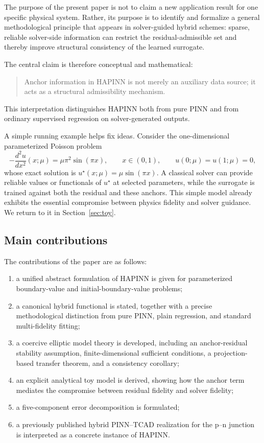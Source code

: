 \documentclass[preprint,12pt]{elsarticle}
\theoremstyle{definition}
\numberwithin{equation}{section}
\begin{document}
The purpose of the present paper is not to claim a new application result for one specific physical system. Rather, its purpose is to identify and formalize a general methodological principle that appears in solver-guided hybrid schemes: sparse, reliable solver-side information can restrict the residual-admissible set and thereby improve structural consistency of the learned surrogate.

The central claim is therefore conceptual and mathematical:
\begin{quote}
Anchor information in HAPINN is not merely an auxiliary data source; it acts as a structural admissibility mechanism.
\end{quote}

This interpretation distinguishes HAPINN both from pure PINN and from ordinary supervised regression on solver-generated outputs.

A simple running example helps fix ideas. Consider the one-dimensional parameterized Poisson problem
\begin{equation}
-\frac{d^2u}{dx^2}(x;\mu)=\mu\pi^2\sin(\pi x),\qquad x\in(0,1),\qquad u(0;\mu)=u(1;\mu)=0,
\label{eq:runningexample}
\end{equation}
whose exact solution is $u^\star(x;\mu)=\mu\sin(\pi x)$. A classical solver can provide reliable values or functionals of $u^\star$ at selected parameters, while the surrogate is trained against both the residual and these anchors. This simple model already exhibits the essential compromise between physics fidelity and solver guidance. We return to it in Section~\ref{sec:toy}.

\subsection*{Main contributions}

The contributions of the paper are as follows:
\begin{enumerate}[label=\arabic*)]
    \item a unified abstract formulation of HAPINN is given for parameterized boundary-value and initial-boundary-value problems;
    \item a canonical hybrid functional is stated, together with a precise methodological distinction from pure PINN, plain regression, and standard multi-fidelity fitting;
    \item a coercive elliptic model theory is developed, including an anchor-residual stability assumption, finite-dimensional sufficient conditions, a projection-based transfer theorem, and a consistency corollary;
    \item an explicit analytical toy model is derived, showing how the anchor term mediates the compromise between residual fidelity and solver fidelity;
    \item a five-component error decomposition is formulated;
    \item a previously published hybrid PINN--TCAD realization for the p--n junction is interpreted as a concrete instance of HAPINN.
\end{enumerate}
\end{document}
